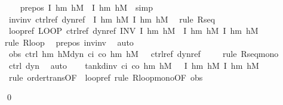 \documentclass[envcountsame,envcountsect]{llncs}
\begin{document}
\begin{example}
\begin{isabellebody}
\ \ \isamarkupfalse%
\ pre{\isacharunderscore}pos{\isacharcolon}\ {\isachardoublequoteopen}{\isasymlceil}I\ h\isactrlsub m\ h\isactrlsub M{\isasymrceil}\ {\isasymle}\ {\isasymlceil}I\ h\isactrlsub m\ h\isactrlsub M{\isasymrceil}{\isachardoublequoteclose}\ \isamarkupfalse\ simp\isanewline
\ \ \isamarkupfalse%
\ inv{\isacharunderscore}inv{\isacharcolon}\ {\isachardoublequoteopen}{\isacharquery}ctrl{\isacharunderscore}ref{\isacharsemicolon}\ {\isacharquery}dyn{\isacharunderscore}ref\ {\isasymle}\ \isactrlbold {\isacharbrackleft}I\ h\isactrlsub m\ h\isactrlsub M{\isacharcomma}\ I\ h\isactrlsub m\ h\isactrlsub M\isactrlbold {\isacharbrackright}{\isachardoublequoteclose}\ \isamarkupfalse%
\ {\isacharparenleft}rule\ R{\isacharunderscore}seq{\isacharparenright}\isanewline
\ \ \isamarkupfalse%
\ loopref{\isacharcolon}\ {\isachardoublequoteopen}LOOP\ {\isacharquery}ctrl{\isacharunderscore}ref{\isacharsemicolon}\ {\isacharquery}dyn{\isacharunderscore}ref\ INV\ I\ h\isactrlsub m\ h\isactrlsub M\ {\isasymle}\ \isactrlbold {\isacharbrackleft}I\ h\isactrlsub m\ h\isactrlsub M{\isacharcomma}\ I\ h\isactrlsub m\ h\isactrlsub M\isactrlbold {\isacharbrackright}{\isachardoublequoteclose}\isanewline
\ \ \ \ \isamarkupfalse%
{\isacharparenleft}rule\ R{\isacharunderscore}loop{\isacharparenright}\ \isamarkupfalse%
\ pre{\isacharunderscore}pos\ inv{\isacharunderscore}inv\ \isamarkupfalse%
\ auto\isanewline
\ \ \isamarkupfalse%
\ obs{\isacharcolon}\ {\isachardoublequoteopen}{\isacharparenleft}ctrl\ h\isactrlsub m\ h\isactrlsub M{\isacharsemicolon}dyn\ c\isactrlsub i\ c\isactrlsub o\ h\isactrlsub m\ h\isactrlsub M\ {\isasymtau}{\isacharparenright}\ {\isasymle}\ {\isacharquery}ctrl{\isacharunderscore}ref{\isacharsemicolon}\ {\isacharquery}dyn{\isacharunderscore}ref{\isachardoublequoteclose}\isanewline
\ \ \ \ \isamarkupfalse%
{\isacharparenleft}rule\ R{\isacharunderscore}seq{\isacharunderscore}mono{\isacharparenright}\ \isamarkupfalse%
\ ctrl\ dyn\ \isamarkupfalse%
\ auto\isanewline
\ \ \isamarkupfalse%
\ {\isachardoublequoteopen}tank{\isacharunderscore}dinv\ c\isactrlsub i\ c\isactrlsub o\ h\isactrlsub m\ h\isactrlsub M\ {\isasymtau}\ {\isasymle}\ \isactrlbold {\isacharbrackleft}I\ h\isactrlsub m\ h\isactrlsub M{\isacharcomma}\ I\ h\isactrlsub m\ h\isactrlsub M\isactrlbold {\isacharbrackright}{\isachardoublequoteclose}\isanewline
\ \ \ \ \isamarkupfalse%
\ {\isacharparenleft}rule\ order{\isacharunderscore}trans{\isacharbrackleft}OF\ {\isacharunderscore}\ loopref{\isacharbrackright}{\isacharcomma}\ rule\ R{\isacharunderscore}loop{\isacharunderscore}mono{\isacharbrackleft}OF\ obs{\isacharbrackright}{\isacharparenright}\isanewline
{}\isamarkupfalse%
\end{isabellebody}
\qed
\end{example}
\end{document}
